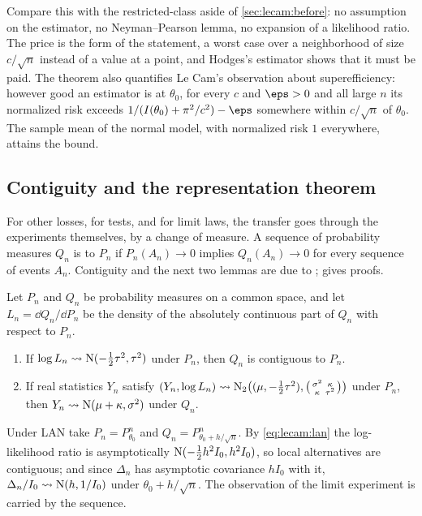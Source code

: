 \begin{refsection}
Compare this with the restricted-class aside of \cref{sec:lecam:before}: no assumption on the estimator, no Neyman--Pearson lemma, no expansion of a likelihood ratio. The price is the form of the statement, a worst case over a neighborhood of size $c/\sqrt n$ instead of a value at a point, and Hodges's estimator shows that it must be paid. The theorem also quantifies Le Cam's observation about superefficiency: however good an estimator is at $\theta_0$, for every $c$ and $\eps>0$ and all large $n$ its normalized risk exceeds $1/(I(\theta_0)+\pi^2/c^2)-\eps$ somewhere within $c/\sqrt n$ of $\theta_0$. The sample mean of the normal model, with normalized risk $1$ everywhere, attains the bound.

\subsection{Contiguity and the representation theorem}

For other losses, for tests, and for limit laws, the transfer goes through the experiments themselves, by a change of measure. A sequence of probability measures $Q_n$ is  to $P_n$ if $P_n(A_n)\to0$ implies $Q_n(A_n)\to0$ for every sequence of events $A_n$. Contiguity and the next two lemmas are due to \textcite{LeCam1960}; \textcite[Chapter~6]{vanderVaart1998} gives proofs.

\begin{theorem}\label{thm:lecam:third-lemma}
Let $P_n$ and $Q_n$ be probability measures on a common space, and let $L_n=\dd Q_n/\dd P_n$ be the density of the absolutely continuous part of $Q_n$ with respect to $P_n$.
\begin{enumerate}[label=(\alph*)]
\item If $\log L_n\rightsquigarrow\mathrm{N}(-\tfrac12\tau^2,\tau^2)$ under $P_n$, then $Q_n$ is contiguous to $P_n$.
\item If real statistics $Y_n$ satisfy $(Y_n,\log L_n)\rightsquigarrow\mathrm{N}_2\big((\mu,-\tfrac12\tau^2),\big(\begin{smallmatrix}\sigma^2&\kappa\\\kappa&\tau^2\end{smallmatrix}\big)\big)$ under $P_n$, then $Y_n\rightsquigarrow\mathrm{N}(\mu+\kappa,\sigma^2)$ under $Q_n$.
\end{enumerate}
\end{theorem}

Under LAN take $P_n=P^n_{\theta_0}$ and $Q_n=P^n_{\theta_0+h/\sqrt n}$. By \eqref{eq:lecam:lan} the log-likelihood ratio is asymptotically $\mathrm{N}(-\frac12h^2I_0,h^2I_0)$, so local alternatives are contiguous; and since $\Delta_n$ has asymptotic covariance $hI_0$ with it, $\Delta_n/I_0\rightsquigarrow\mathrm{N}(h,1/I_0)$ under $\theta_0+h/\sqrt n$. The observation of the limit experiment is carried by the sequence.


\end{refsection}
